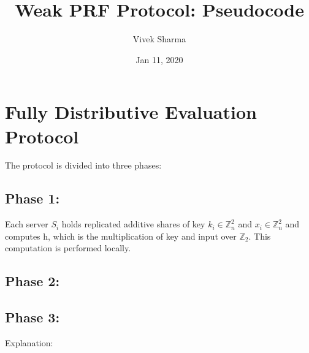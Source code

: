 \documentclass[11pt]{article}
\title{Weak PRF Protocol: Pseudocode}
\author{Vivek Sharma}
\date{Jan 11, 2020}
\begin{document}
\maketitle


\section{Fully Distributive Evaluation Protocol}


The protocol is divided into three phases:

\subsection{Phase 1:} 
Each server $S_{i}$ holds replicated additive shares of key $k_{i} \in \mathbb{Z}_{n}^{2}$ and $x_{i} \in \mathbb{Z}_{n}^{2}$ and computes h, which is the multiplication of key and input over $\mathbb{Z}_2$. This computation is performed locally. 
\subsection{Phase 2:}

\subsection{Phase 3:}


 
Explanation:
\end{document}
